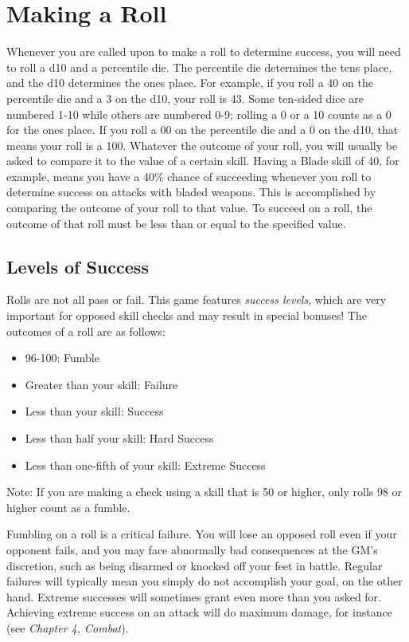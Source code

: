 \documentclass[12pt]{book}
\begin{document}
\section{Making a Roll}
Whenever you are called upon to make a roll to determine success, you will need to roll a d10 and a percentile die. The percentile die determines the tens place, and the d10 determines the ones place. For example, if you roll a 40 on the percentile die and a 3 on the d10, your roll is 43. Some ten-sided dice are numbered 1-10 while others are numbered 0-9; rolling a 0 or a 10 counts as a 0 for the ones place. If you roll a 00 on the percentile die and a 0 on the d10, that means your roll is a 100.
Whatever the outcome of your roll, you will usually be asked to compare it to the value of a certain skill. Having a Blade skill of 40, for example, means you have a 40\% chance of succeeding whenever you roll to determine success on attacks with bladed weapons. This is accomplished by comparing the outcome of your roll to that value. To succeed on a roll, the outcome of that roll must be less than or equal to the specified value.

\subsection{Levels of Success}
Rolls are not all pass or fail. This game features \textit{success levels}, which are very important for opposed skill checks and may result in special bonuses! The outcomes of a roll are as follows:

\begin{itemize}
	\item 96-100: Fumble
	\item Greater than your skill: Failure
	\item Less than your skill: Success
	\item Less than half your skill: Hard Success
	\item Less than one-fifth of your skill: Extreme Success
\end{itemize}

Note: If you are making a check using a skill that is 50 or higher, only rolls 98 or higher count as a fumble.

Fumbling on a roll is a critical failure. You will lose an opposed roll even if your opponent fails, and you may face abnormally bad consequences at the GM's discretion, such as being disarmed or knocked off your feet in battle. Regular failures will typically mean you simply do not accomplish your goal, on the other hand. Extreme successes will sometimes grant even more than you asked for. Achieving extreme success on an attack will do maximum damage, for instance (see \textit{Chapter 4, Combat}).
\end{document}
